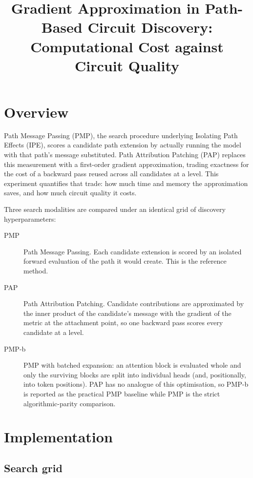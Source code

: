 \documentclass[11pt,a4paper]{article}
\title{Gradient Approximation in Path-Based Circuit Discovery:\\
       Computational Cost against Circuit Quality}
\author{}
\date{}
\begin{document}
\maketitle

\section{Overview}

Path Message Passing (PMP), the search procedure underlying Isolating Path Effects (IPE),
scores a candidate path extension by actually running the model with that path's message
substituted. Path Attribution Patching (PAP) replaces this measurement with a first-order
gradient approximation, trading exactness for the cost of a backward pass reused across all
candidates at a level. This experiment quantifies that trade: how much time and memory the
approximation saves, and how much circuit quality it costs.

Three search modalities are compared under an identical grid of discovery hyperparameters:

\begin{description}
  \item[PMP] Path Message Passing. Each candidate extension is scored by an isolated forward
    evaluation of the path it would create. This is the reference method.
  \item[PAP] Path Attribution Patching. Candidate contributions are approximated by the inner
    product of the candidate's message with the gradient of the metric at the attachment point,
    so one backward pass scores every candidate at a level.
  \item[PMP-b] PMP with batched expansion: an attention block is evaluated whole and only the
    surviving blocks are split into individual heads (and, positionally, into token positions).
    PAP has no analogue of this optimisation, so PMP-b is reported as the practical PMP baseline
    while PMP is the strict algorithmic-parity comparison.
\end{description}

\section{Implementation}

\subsection{Search grid}
\end{document}
